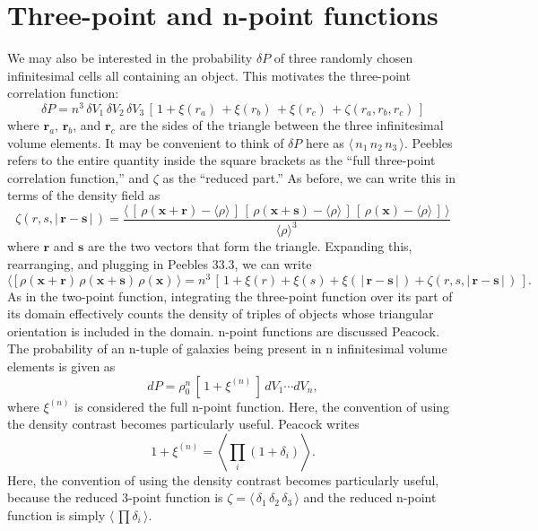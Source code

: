 \documentclass{article}
\begin{document}
\section{Three-point and n-point functions}
We may also be interested in the probability $\delta P$ of three randomly chosen infinitesimal cells all containing an object. This motivates the three-point correlation function:
\[
\delta P=n^3\,\delta V_1\,\delta V_2\,\delta V_3\,[\,1+\xi(r_{a})\,+\xi(r_{b})\,+\xi(r_{c})\,+\zeta(r_{a},r_b,r_{c})\,] \tag{Peebles 34.1}
\]
where $\mathbf{r}_{a}$, $\mathbf{r}_{b}$, and $\mathbf{r}_{c}$ are the sides of the triangle between the three infinitesimal volume elements. 
It may be convenient to think of $\delta P$ here as $\langle\,n_1\,n_2\,n_3\,\rangle$.
Peebles refers to the entire quantity inside the square brackets as the \enquote{full three-point correlation function,} and $\zeta$ as the \enquote{reduced part.}
As before, we can write this in terms of the density field as
\[
\zeta(r,s,|\,\mathbf{r}-\mathbf{s}\,|\,)=\frac{\langle\,[\,\rho(\mathbf{x}+\mathbf{r})-\langle\rho\rangle\,]\,[\,\rho(\mathbf{x}+\mathbf{s})-\langle\rho\rangle\,]\,[\,\rho(\mathbf{x})-\langle\rho\rangle\,]\,\rangle}{\langle\rho\rangle^3}\tag{Peebles 34.5}
\]
where $\mathbf{r}$ and $\mathbf{s}$ are the two vectors that form the triangle.
Expanding this, rearranging, and plugging in Peebles 33.3, we can write
\[
\langle\,[\,\rho(\mathbf{x}+\mathbf{r})\,\rho(\mathbf{x}+\mathbf{s})\,\rho(\mathbf{x})\,\rangle=n^3\,[\,1+\xi(r)+\xi(s)+\xi(\,|\,\mathbf{r}-\mathbf{s}\,|\,)+\zeta(r,s,|\,\mathbf{r}-\mathbf{s}\,|\,)\,]. \tag{Peebles 34.6}
\]
As in the two-point function, integrating the three-point function over its part of its domain effectively counts the density of triples of objects whose triangular orientation is included in the domain.
n-point functions are discussed Peacock. The probability of an n-tuple of galaxies being present in n infinitesimal volume elements is given as
\[
d P=\rho_0^n\,[\,1+\xi^{(n)}\,]\,dV_1\cdots dV_n,\tag{Peacock 16.31}
\]
where $\xi^{(n)}$ is considered the full n-point function.
Here, the convention of using the density contrast becomes particularly useful. Peacock writes
\[
1+\xi^{(n)}=\left\langle\prod_i(1+\delta_i)\right\rangle.\tag{Peacock 16.32}
\]
Here, the convention of using the density contrast becomes particularly useful, because the reduced 3-point function is $\zeta=\langle\,\delta_1\,\delta_2\,\delta_3\,\rangle$
and the reduced n-point function is simply $\langle\,\prod\delta_i\,\rangle$.
\end{document}
